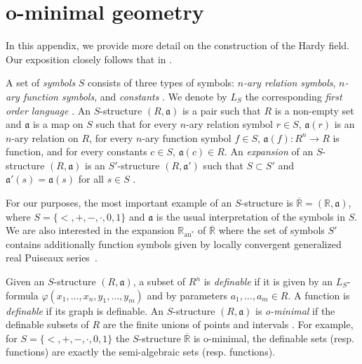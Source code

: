 \documentclass{article}
\theoremstyle{definition}
\begin{document}
\appendix
\section{o-minimal geometry}
\label{AppendixA}
In this appendix, we provide more detail on the construction of the Hardy field. Our exposition closely follows that in \cite{Alessandrini::LogLimit,Ebbinghaus::Logic}.
 
A set of \emph{symbols} $S$ consists of three types of symbols: \emph{$n$-ary relation symbols}, \emph{$n$-ary function symbols}, and \emph{constants} \cite[Chapter II, Definition 2.1]{Ebbinghaus::Logic}. We denote by $L_S$ the corresponding \emph{first order language} \cite[Chapter II, Definition 3.2]{Ebbinghaus::Logic}. An $S$-structure $(R,\mathfrak{a})$ is a pair such that $R$ is a non-empty set and $\mathfrak{a}$ is a map on $S$ such that for every $n$-ary relation symbol $r \in S$, $\mathfrak{a}(r)$ is an $n$-ary relation on $R$, for every $n$-ary function symbol $f \in S$, $\mathfrak{a}(f)\colon R^n \to R$ is function, and for every constants $c \in S$, $\mathfrak{a}(c) \in R$. An \emph{expansion} of an $S$-structure $(R,\mathfrak{a})$ is an  $S'$-structure $(R,\mathfrak{a}')$  such that $S \subset S'$ and $\mathfrak{a}'(s) = \mathfrak{a}(s)$ for all $s \in S$ \cite[Chapter III, Definition 4.7]{Ebbinghaus::Logic}.

For our purposes, the most important example of an $S$-structure is $\overline{\mathbb{R}} = (\mathbb{R},\mathfrak{a})$, where $S = \{ <,+,-,\cdot,0,1\}$ and $\mathfrak{a}$ is the usual interpretation of the symbols in $S$. We are also interested in the expansion $\mathbb{R}_{\text{an}^*}$ of  $\overline{\mathbb{R}}$ where the set of symbols $S'$ contains additionally function symbols given by locally convergent generalized real Puiseaux series~\cite{Dries::GenPowerSeries}.

Given an $S$-structure $(R,\mathfrak{a})$, a subset of $R^n$ is \emph{definable} if it is given by an $L_S$-formula $\varphi(x_1,\dots,x_n,y_1,\dots,y_m)$ and by parameters $a_1,\dots,a_m \in R$. A function is \emph{definable} if its graph is definable. An  $S$-structure $(R,\mathfrak{a})$ is \emph{o-minimal} if the definable subsets of $R$ are the finite unions of points and intervals \cite[Definition 1.4]{Coste::oMinimal}. For example, for $S = \{ <,+,-,\cdot,0,1\}$ the $S$-structure $\overline{\mathbb{R}}$ is o-minimal, the definable sets (resp. functions) are exactly the semi-algebraic sets (resp. functions). 
\end{document}
